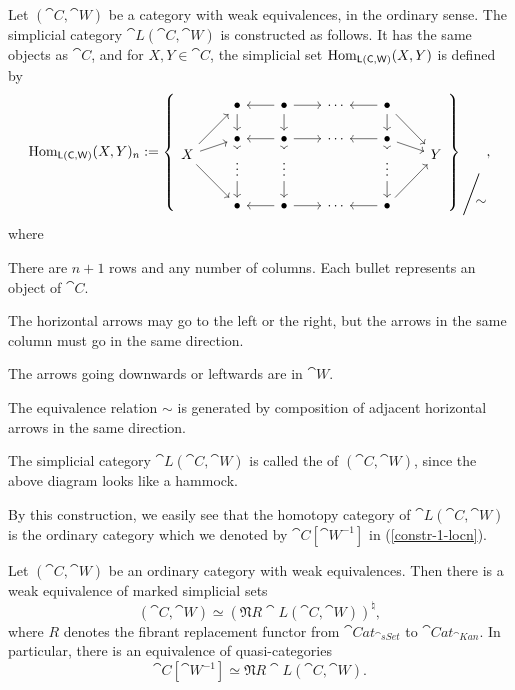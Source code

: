 \begin{construction}
    Let $(\cat{C},\cat{W})$ be a category with weak equivalences,
    in the ordinary sense.
    The simplicial category $\cat{L}(\cat{C},\cat{W})$ is constructed as follows.
    It has the same objects as $\cat{C}$, and for $X,Y\in\cat{C}$,
    the simplicial set $\operatorname{Hom}_{\mathsf{L}(\mathsf{C},\mathsf{W})}(X,Y)$ is defined by 
    \[ \Hom_{\cat{L}(\cat{C},\cat{W})}(X,Y)_n := \left\{
        \begin{tikzcd}[row sep={1.2em,between origins},column sep=2em]
            & \bullet\ar[dd] & \bullet\ar[l]\ar[r]\ar[dd] & \cdots & \bullet\ar[l]\ar[dd]\ar[dddr] \\\\
            & \bullet\ar[dd] & \bullet\ar[l]\ar[r]\ar[dd] & \cdots & \bullet\ar[l]\ar[dd]\ar[dr] \\
            X \ar[uuur]\ar[ur]\ar[dddr] &&&&& Y \\
            & \vdots\ar[dd] & \vdots\ar[dd] && \vdots\ar[dd] \\\\
            & \bullet & \bullet\ar[l]\ar[r] & \cdots & \bullet\ar[l]\ar[uuur]
        \end{tikzcd}
    \right\}\raisebox{-3em}{$\Bigg/$}\mkern-6mu\raisebox{-3.5em}{$\sim$}, \]
    where 
    \begin{itms}
        \item There are $n+1$ rows and any number of columns.
        Each bullet represents an object of $\cat{C}$.
        \item The horizontal arrows may go to the left or the right,
        but the arrows in the same column must go in the same direction.
        \item The arrows going downwards or leftwards are in $\cat{W}$.
        \item The equivalence relation $\sim$ is generated by 
        composition of adjacent horizontal arrows in the same direction.
    \end{itms}
    The simplicial category $\cat{L}(\cat{C},\cat{W})$ is called the 
     of $(\cat{C},\cat{W})$,
    since the above diagram looks like a hammock. \varqed
\end{construction}

By this construction, we easily see that the homotopy category of $\cat{L}(\cat{C},\cat{W})$
is the ordinary category which we denoted by $\cat{C}[\cat{W}^{-1}]$ in (\ref{constr-1-locn}).

\begin{theorem}
    Let $(\cat{C},\cat{W})$ be an ordinary category with weak equivalences.
    Then there is a weak equivalence of marked simplicial sets 
    \[ (\cat{C},\cat{W}) \simeq (\mathfrak{N}R\cat{L}(\cat{C},\cat{W}))^\natural, \]
    where $R$ denotes the fibrant replacement functor
    from $\cat{Cat}_{\cat{sSet}}$ to $\cat{Cat}_{\cat{Kan}}$.
    In particular, there is an equivalence of quasi-categories
    \[ \cat{C}[\cat{W}^{-1}] \simeq \mathfrak{N}R\cat{L}(\cat{C},\cat{W}). \]
\end{theorem}

